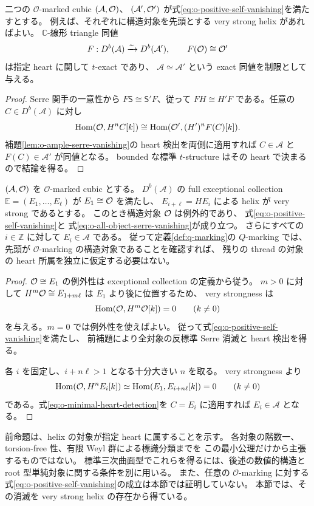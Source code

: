 \begin{corollary}
\label{cor:o-pointed-derived-exact}
二つの $\mathcal O$-marked cubic $(\mathcal A,\mathcal O)$、
$(\mathcal A',\mathcal O')$ が式\eqref{eq:o-positive-self-vanishing}を満たすとする。
例えば、それぞれに構造対象を先頭とする very strong helix があればよい。
$\mathbb C$-線形 triangle 同値
\[
 F:D^b(\mathcal A)\xrightarrow{\sim}D^b(\mathcal A'),
 \qquad F(\mathcal O)\cong\mathcal O'
\]
は指定 heart に関して $t$-exact であり、
$\mathcal A\simeq\mathcal A'$ という exact 同値を制限として与える。
\end{corollary}
\begin{proof}
Serre 関手の一意性から $F\mathsf S\cong\mathsf S'F$、従って
$FH\cong H'F$ である。任意の $C\in D^b(\mathcal A)$ に対し
\[
 \operatorname{Hom}(\mathcal O,H^nC[k])
 \cong\operatorname{Hom}(\mathcal O',(H')^nF(C)[k]).
\]
補題\ref{lem:o-ample-serre-vanishing}の heart 検出を両側に適用すれば
$C\in\mathcal A$ と $F(C)\in\mathcal A'$ が同値となる。
bounded な標準 $t$-structure はその heart で決まるので結論を得る。
\end{proof}

\begin{proposition}
\label{prop:o-helix-heart-recognition}
$(\mathcal A,\mathcal O)$ を $\mathcal O$-marked cubic とする。
$D^b(\mathcal A)$ の full exceptional collection
$\mathbb E=(E_1,\ldots,E_\ell)$ が $E_1\cong\mathcal O$ を満たし、
$E_{i+\ell}=HE_i$ による helix が very strong であるとする。
このとき構造対象 $\mathcal O$ は例外的であり、
式\eqref{eq:o-positive-self-vanishing}と
式\eqref{eq:o-all-object-serre-vanishing}が成り立つ。
さらにすべての $i\in\mathbb Z$ に対して $E_i\in\mathcal A$ である。
従って定義\ref{def:q-marking}の $Q$-marking では、
先頭が $\mathcal O$-marking の構造対象であることを確認すれば、
残りの thread の対象の heart 所属を独立に仮定する必要はない。
\end{proposition}
\begin{proof}
$\mathcal O\cong E_1$ の例外性は exceptional collection の定義から従う。
$m>0$ に対して $H^m\mathcal O\cong E_{1+m\ell}$ は $E_1$ より後に位置するため、
very strongness は
\[
 \operatorname{Hom}(\mathcal O,H^m\mathcal O[k])=0\qquad(k\ne0)
\]
を与える。$m=0$ では例外性を使えばよい。
従って式\eqref{eq:o-positive-self-vanishing}を満たし、
前補題により全対象の反標準 Serre 消滅と heart 検出を得る。

各 $i$ を固定し、$i+n\ell>1$ となる十分大きい $n$ を取る。
very strongness より
\[
 \operatorname{Hom}(\mathcal O,H^nE_i[k])
 \simeq\operatorname{Hom}(E_1,E_{i+n\ell}[k])=0
 \qquad(k\ne0)
\]
である。式\eqref{eq:o-minimal-heart-detection}を $C=E_i$ に適用すれば
$E_i\in\mathcal A$ となる。
\end{proof}

\begin{remark}
前命題は、helix の対象が指定 heart に属することを示す。
各対象の階数一、torsion-free 性、有限 Weyl 群による標識分類までを
この最小公理だけから主張するものではない。
標準三次曲面型でこれらを得るには、後述の数値的構造と
root 型単純対象に関する条件を別に用いる。
また、任意の $\mathcal O$-marking に対する
式\eqref{eq:o-positive-self-vanishing}の成立は本節では証明していない。
本節では、その消滅を very strong helix の存在から得ている。
\end{remark}
